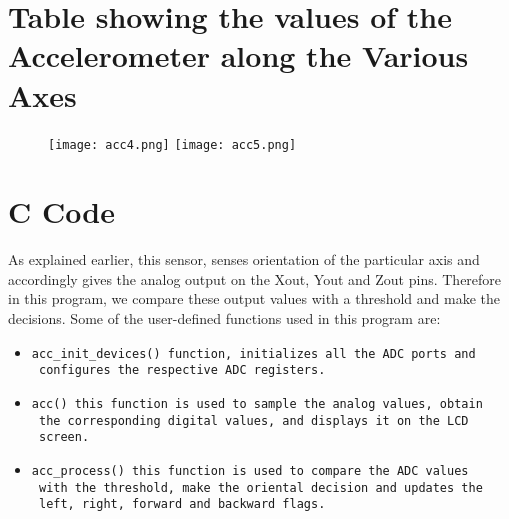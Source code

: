 \documentclass[a4paper,12 pt]{article}
\begin{document}
\section{Table showing the values of the Accelerometer along the Various Axes}

\begin{figure}[!h]
\begin{center}
\texttt{[image: acc4.png]}
\label{fig:5}
\texttt{[image: acc5.png]}
\label{fig:6}
\end{center}
\end{figure}
\pagebreak


\section{C Code}
As explained earlier, this sensor, senses orientation of the particular axis and accordingly gives the analog output on the Xout, Yout and Zout pins. Therefore in this program, we compare these output values with a threshold and make the decisions.
Some of the user-defined functions used in this program are:



\begin{itemize}
\item \begin{verbatim}
acc_init_devices() function, initializes all the ADC ports and
 configures the respective ADC registers.
\end{verbatim}
\end{itemize}

\begin{itemize}
\item	\begin{verbatim}
acc() this function is used to sample the analog values, obtain
 the corresponding digital values, and displays it on the LCD
 screen.
\end{verbatim}
\end{itemize}

\begin{itemize}
\item	\begin{verbatim}
acc_process() this function is used to compare the ADC values
 with the threshold, make the oriental decision and updates the
 left, right, forward and backward flags.
\end{verbatim}
\end{itemize}
\end{document}
